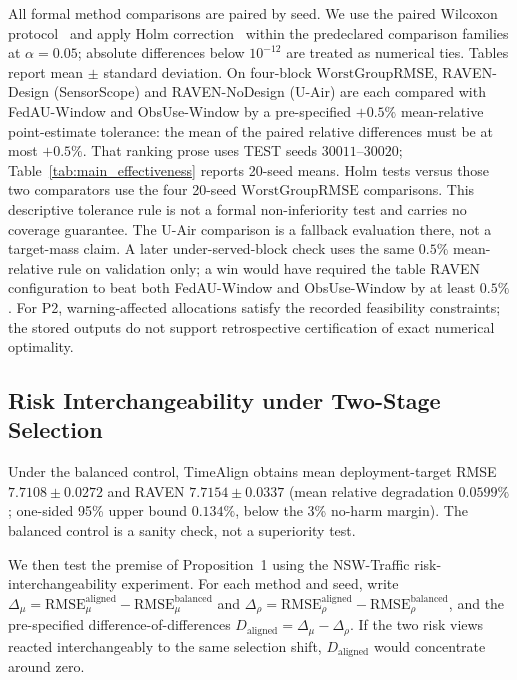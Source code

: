 \documentclass[letterpaper,journal]{IEEEtran}
\begin{document}
All formal method comparisons are paired by seed.  We use the paired
Wilcoxon protocol~\cite{wilcoxon1945individual} and apply Holm
correction~\cite{holm1979simple} within the predeclared comparison
families at $\alpha=0.05$; absolute differences below
$10^{-12}$ are treated as numerical ties.  Tables report
mean $\pm$ standard deviation.  On four-block $\mathrm{WorstGroupRMSE}$,
RAVEN-Design (SensorScope) and RAVEN-NoDesign (U-Air) are each compared with FedAU-Window and ObsUse-Window by a
pre-specified $+0.5\%$ mean-relative point-estimate tolerance: the mean
of the paired relative differences must be at most $+0.5\%$.
That ranking prose uses TEST seeds $30011$--$30020$; Table~\ref{tab:main_effectiveness} reports 20-seed means.
Holm tests versus those two comparators use the four 20-seed
$\mathrm{WorstGroupRMSE}$ comparisons.
This descriptive tolerance rule is not a formal non-inferiority test
and carries no coverage guarantee.  The U-Air comparison is a fallback
evaluation there, not a target-mass claim.  A later under-served-block check uses the same
$0.5\%$ mean-relative rule on validation only; a win would have required
the table RAVEN configuration to beat both FedAU-Window and ObsUse-Window by at least $0.5\%$.
For P2, warning-affected allocations satisfy
the recorded feasibility constraints; the stored outputs do not
support retrospective certification of exact numerical optimality.

\subsection{Risk Interchangeability under Two-Stage Selection}
\label{subsec:eval_rq1}

Under the balanced control, TimeAlign obtains mean deployment-target
RMSE $7.7108\pm0.0272$ and RAVEN $7.7154\pm0.0337$ (mean relative
degradation $0.0599\%$; one-sided 95\% upper bound $0.134\%$, below the
3\% no-harm margin).  The balanced control is a sanity check, not a superiority test.

We then test the premise of Proposition~1 using the NSW-Traffic risk-interchangeability
experiment.  For each method and seed, write
$\Delta_{\mu}=\mathrm{RMSE}_{\mu}^{\mathrm{aligned}}
-\mathrm{RMSE}_{\mu}^{\mathrm{balanced}}$ and
$\Delta_{\rho}=\mathrm{RMSE}_{\rho}^{\mathrm{aligned}}
-\mathrm{RMSE}_{\rho}^{\mathrm{balanced}}$, and the pre-specified
difference-of-differences $D_{\mathrm{aligned}}=\Delta_{\mu}-\Delta_{\rho}$.
If the two risk views reacted interchangeably to the same selection shift,
$D_{\mathrm{aligned}}$ would concentrate around zero.
\end{document}
